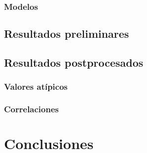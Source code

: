 \documentclass[12pt]{book}
\begin{document}
\subsection{Modelos}
\section{Resultados preliminares}
\section{Resultados postprocesados}
\subsection{Valores atípicos}
\subsection{Correlaciones}
\chapter{Conclusiones}
\end{document}
